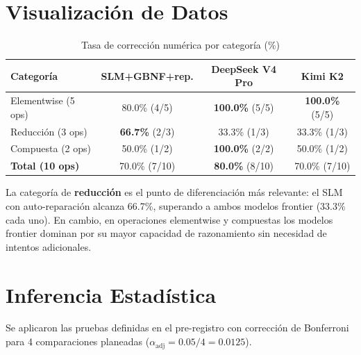 \documentclass[12pt]{article}
\begin{document}
\section{Visualización de Datos}

\begin{table}[H]
\centering
\caption{Tasa de corrección numérica por categoría (\%)}
\begin{tabular}{lccc}
\toprule
\textbf{Categoría} & \textbf{SLM+GBNF+rep.} & \textbf{DeepSeek V4 Pro} & \textbf{Kimi K2} \\
\midrule
Elementwise (5 ops) & 80.0\% (4/5) & \textbf{100.0\%} (5/5) & \textbf{100.0\%} (5/5) \\
Reducción   (3 ops) & \textbf{66.7\%} (2/3) & 33.3\% (1/3) & 33.3\% (1/3) \\
Compuesta   (2 ops) & 50.0\% (1/2) & \textbf{100.0\%} (2/2) & 50.0\% (1/2) \\
\midrule
\textbf{Total (10 ops)} & 70.0\% (7/10) & \textbf{80.0\%} (8/10) & 70.0\% (7/10) \\
\bottomrule
\end{tabular}
\end{table}

La categoría de \textbf{reducción} es el punto de diferenciación más relevante:
el SLM con auto-reparación alcanza 66.7\%, superando a ambos modelos frontier
(33.3\% cada uno). En cambio, en operaciones elementwise y compuestas los modelos
frontier dominan por su mayor capacidad de razonamiento sin necesidad de intentos
adicionales.

\section{Inferencia Estadística}
\label{sec:inferencia}

Se aplicaron las pruebas definidas en el pre-registro con corrección de Bonferroni
para 4 comparaciones planeadas ($\alpha_{\text{adj}} = 0.05/4 = 0.0125$).
\end{document}
